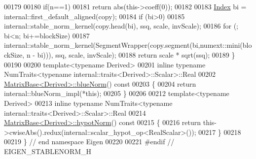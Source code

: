 \begin{DoxyCode}
00179   
00180   \textcolor{keywordflow}{if}(n==1)
00181     \textcolor{keywordflow}{return} abs(this->coeff(0));
00182   
00183   \hyperlink{namespace_eigen_a62e77e0933482dafde8fe197d9a2cfde}{Index} bi = internal::first\_default\_aligned(copy);
00184   \textcolor{keywordflow}{if} (bi>0)
00185     internal::stable\_norm\_kernel(copy.head(bi), ssq, scale, invScale);
00186   \textcolor{keywordflow}{for} (; bi<n; bi+=blockSize)
00187     internal::stable\_norm\_kernel(SegmentWrapper(copy.segment(bi,numext::mini(blockSize, n - bi))), ssq, 
      scale, invScale);
00188   \textcolor{keywordflow}{return} scale * sqrt(ssq);
00189 \}
00190 
00200 \textcolor{keyword}{template}<\textcolor{keyword}{typename} Derived>
00201 \textcolor{keyword}{inline} \textcolor{keyword}{typename} NumTraits<typename internal::traits<Derived>::Scalar>::Real
00202 \hyperlink{group___core___module_a3f3faa00163c16824ff03e58a210c74c}{MatrixBase<Derived>::blueNorm}()\textcolor{keyword}{ const}
00203 \textcolor{keyword}{}\{
00204   \textcolor{keywordflow}{return} internal::blueNorm\_impl(*\textcolor{keyword}{this});
00205 \}
00206 
00212 \textcolor{keyword}{template}<\textcolor{keyword}{typename} Derived>
00213 \textcolor{keyword}{inline} \textcolor{keyword}{typename} NumTraits<typename internal::traits<Derived>::Scalar>::Real
00214 \hyperlink{group___core___module_a32222d3b6677e6cdf0b801463f329b72}{MatrixBase<Derived>::hypotNorm}()\textcolor{keyword}{ const}
00215 \textcolor{keyword}{}\{
00216   \textcolor{keywordflow}{return} this->cwiseAbs().redux(internal::scalar\_hypot\_op<RealScalar>());
00217 \}
00218 
00219 \} \textcolor{comment}{// end namespace Eigen}
00220 
00221 \textcolor{preprocessor}{#endif // EIGEN\_STABLENORM\_H}
\end{DoxyCode}
